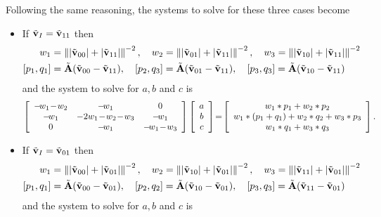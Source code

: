  Following the same reasoning, the systems to solve for these three cases become
\begin{itemize}[leftmargin=*]
	\item If $\tilde{\mathbf{v}}_I = \tilde{\mathbf{v}}_{11}$ then
	\begin{align}
	w_1 &= \left\lVert |\tilde{\mathbf{v}}_{00}| + |\tilde{\mathbf{v}}_{11}|\right\rVert^{-2}, \quad
	w_2 = \left\lVert |\tilde{\mathbf{v}}_{01}| + |\tilde{\mathbf{v}}_{11}|\right\rVert^{-2}, \quad
	w_3 = \left\lVert |\tilde{\mathbf{v}}_{10}| + |\tilde{\mathbf{v}}_{11}|\right\rVert^{-2}\\
	[p_1,q_1] &= \tilde{\mathbf{A}} (\tilde{\mathbf{v}}_{00} - \tilde{\mathbf{v}}_{11}), \quad
	[p_2,q_3] = \tilde{\mathbf{A}} (\tilde{\mathbf{v}}_{01} - \tilde{\mathbf{v}}_{11}), \quad
	[p_3,q_3] = \tilde{\mathbf{A}} (\tilde{\mathbf{v}}_{10} - \tilde{\mathbf{v}}_{11}) 
	\end{align}
	and the system to solve for $a,b$ and $c$ is
	\begin{align}
	\left[\begin{array}{c c c}-\!w_1\!-\!w_2 & -\!w_1 & 0\\ -\!w_1 &-2w_1\!-\!w_2\!-\!w_3 & -\!w_1\\ 0 &-\!w_1 & -\!w_1\!-\!w_3\end{array}\right] 
	\left[\begin{array}{c}a \\ b \\ c\end{array}\right]
	\!=\!
	\left[\begin{array}{c}w_1*p_1 + w_2*p_2 \\ w_1*(p_1+q_1) + w_2*q_2 + w_3*p_3 \\ w_1*q_1+w_3*q_3\end{array}\right].
	\end{align}
	\item If $\tilde{\mathbf{v}}_I = \tilde{\mathbf{v}}_{01}$ then
	\begin{align}
	w_1 &= \left\lVert|\tilde{\mathbf{v}}_{00}| + |\tilde{\mathbf{v}}_{01}|\right\rVert^{-2}, \quad
	w_2 = \left\lVert|\tilde{\mathbf{v}}_{10}| + |\tilde{\mathbf{v}}_{01}|\right\rVert^{-2}, \quad
	w_3 = \left\lVert|\tilde{\mathbf{v}}_{11}| + |\tilde{\mathbf{v}}_{01}|\right\rVert^{-2}\\
	[p_1, q_1] &= \tilde{\mathbf{A}} (\tilde{\mathbf{v}}_{00} - \tilde{\mathbf{v}}_{01}), \quad
	[p_2, q_2] = \tilde{\mathbf{A}} (\tilde{\mathbf{v}}_{10} - \tilde{\mathbf{v}}_{01}), \quad
	[p_3, q_3] = \tilde{\mathbf{A}} (\tilde{\mathbf{v}}_{11} - \tilde{\mathbf{v}}_{01})
	\end{align}
	and the system to solve for $a,b$ and $c$ is

\end{itemize}
